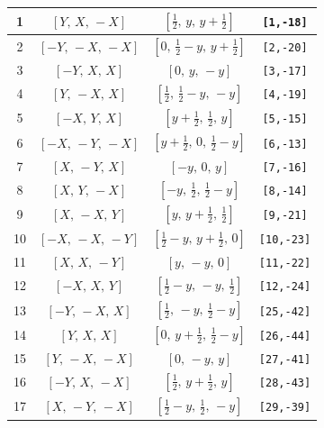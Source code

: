 \documentclass[fleqn,8pt]{jsarticle}
\begin{document}
\begin{longtable}{cccc}
1 & $\left[ Y,\, X,\, - X \right]$ & $\left[ \frac{1}{2},\, y,\, y + \frac{1}{2} \right]$ & {\tt [1,-18]} \\ \hline
2 & $\left[ - Y,\, - X,\, - X \right]$ & $\left[ 0,\, \frac{1}{2} - y,\, y + \frac{1}{2} \right]$ & {\tt [2,-20]} \\ \hline
3 & $\left[ - Y,\, X,\, X \right]$ & $\left[ 0,\, y,\, - y \right]$ & {\tt [3,-17]} \\ \hline
4 & $\left[ Y,\, - X,\, X \right]$ & $\left[ \frac{1}{2},\, \frac{1}{2} - y,\, - y \right]$ & {\tt [4,-19]} \\ \hline
5 & $\left[ - X,\, Y,\, X \right]$ & $\left[ y + \frac{1}{2},\, \frac{1}{2},\, y \right]$ & {\tt [5,-15]} \\ \hline
6 & $\left[ - X,\, - Y,\, - X \right]$ & $\left[ y + \frac{1}{2},\, 0,\, \frac{1}{2} - y \right]$ & {\tt [6,-13]} \\ \hline
7 & $\left[ X,\, - Y,\, X \right]$ & $\left[ - y,\, 0,\, y \right]$ & {\tt [7,-16]} \\ \hline
8 & $\left[ X,\, Y,\, - X \right]$ & $\left[ - y,\, \frac{1}{2},\, \frac{1}{2} - y \right]$ & {\tt [8,-14]} \\ \hline
9 & $\left[ X,\, - X,\, Y \right]$ & $\left[ y,\, y + \frac{1}{2},\, \frac{1}{2} \right]$ & {\tt [9,-21]} \\ \hline
10 & $\left[ - X,\, - X,\, - Y \right]$ & $\left[ \frac{1}{2} - y,\, y + \frac{1}{2},\, 0 \right]$ & {\tt [10,-23]} \\ \hline
11 & $\left[ X,\, X,\, - Y \right]$ & $\left[ y,\, - y,\, 0 \right]$ & {\tt [11,-22]} \\ \hline
12 & $\left[ - X,\, X,\, Y \right]$ & $\left[ \frac{1}{2} - y,\, - y,\, \frac{1}{2} \right]$ & {\tt [12,-24]} \\ \hline
13 & $\left[ - Y,\, - X,\, X \right]$ & $\left[ \frac{1}{2},\, - y,\, \frac{1}{2} - y \right]$ & {\tt [25,-42]} \\ \hline
14 & $\left[ Y,\, X,\, X \right]$ & $\left[ 0,\, y + \frac{1}{2},\, \frac{1}{2} - y \right]$ & {\tt [26,-44]} \\ \hline
15 & $\left[ Y,\, - X,\, - X \right]$ & $\left[ 0,\, - y,\, y \right]$ & {\tt [27,-41]} \\ \hline
16 & $\left[ - Y,\, X,\, - X \right]$ & $\left[ \frac{1}{2},\, y + \frac{1}{2},\, y \right]$ & {\tt [28,-43]} \\ \hline
17 & $\left[ X,\, - Y,\, - X \right]$ & $\left[ \frac{1}{2} - y,\, \frac{1}{2},\, - y \right]$ & {\tt [29,-39]} \\ \hline

\end{longtable}
\end{document}
